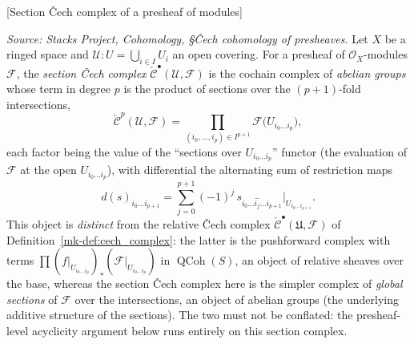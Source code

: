 \begin{definition}

[Section {\v C}ech complex of a presheaf of modules]
  \label{mk-def:section_cech_complex}

  \textit{Source: Stacks Project, Cohomology, \S{\v C}ech cohomology of presheaves.}
  Let \(X\) be a ringed space and \(\mathcal{U} : U = \bigcup_{i \in I} U_i\) an open
  covering. For a presheaf of \(\mathcal{O}_X\)-modules \(\mathcal{F}\), the
  \emph{section {\v C}ech complex} \(\check{\mathcal{C}}^\bullet(\mathcal{U},
  \mathcal{F})\) is the cochain complex of \emph{abelian groups} whose term in
  degree \(p\) is the product of sections over the \((p+1)\)-fold intersections,
  \[
    \check{\mathcal{C}}^p(\mathcal{U}, \mathcal{F})
      = \prod_{(i_0, \ldots, i_p) \in I^{p+1}}
        \mathcal{F}\bigl(U_{i_0 \ldots i_p}\bigr),
  \]
  each factor being the value of the ``sections over \(U_{i_0 \ldots i_p}\)'' functor
  (the evaluation of \(\mathcal{F}\) at the open \(U_{i_0 \ldots i_p}\)), with
  differential the alternating sum of restriction maps
  \[
    d(s)_{i_0 \ldots i_{p+1}}
      = \sum_{j=0}^{p+1} (-1)^j\,
        s_{i_0 \ldots \widehat{i_j} \ldots i_{p+1}}
        \big|_{U_{i_0 \ldots i_{p+1}}}.
  \]
  This object is \emph{distinct} from the relative {\v C}ech complex
  \(\check{\mathcal{C}}^\bullet(\mathfrak{U}, \mathcal{F})\) of
  Definition~\ref{mk-def:cech_complex}: the latter is the pushforward complex with terms
  \(\prod (f|_{U_{i_0 \ldots i_p}})_*(\mathcal{F}|_{U_{i_0 \ldots i_p}})\) in
  \(\operatorname{QCoh}(S)\), an object of relative sheaves over the base, whereas the
  section {\v C}ech complex here is the simpler complex of \emph{global sections} of
  \(\mathcal{F}\) over the intersections, an object of abelian groups (the underlying
  additive structure of the sections). The two must not be conflated: the
  presheaf-level acyclicity argument below runs entirely on this section complex.
\end{definition}

